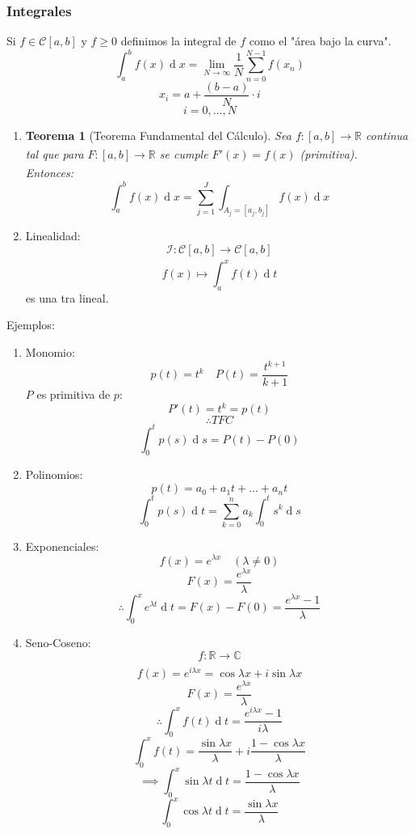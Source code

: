 \documentclass[11pt]{book}
\renewcommand{\d}[1]{\ensuremath{\operatorname{d}\!{#1}}}
\newcommand{\set}[1]{\mathbb{#1}}
\newcommand{\func}[5]{#1:#2\xrightarrow[#5]{#4}#3}
\newtheorem{thm}{Teorema}[section]
\theoremstyle{definition}
\begin{document}
\subsubsection{Integrales}
Si $f\in\mathcal{C}[a,b]$ y $f\geq 0$ definimos la integral de $f$ como el "área bajo la curva".
\[\int^b_a f(x)\d{x}=\lim_{N\rightarrow\infty}\frac{1}{N}\sum^{N-1}_{n=0}f(x_n)\]
\[x_i=a+\frac{(b-a)}{N}\cdot i\]
\[i=0,...,N\]
\begin{enumerate}
	\item \begin{thm}[Teorema Fundamental del Cálculo]
		Sea $\func{f}{[a,b]}{\set{R}}{}{}$ continua tal que para $\func{F}{[a,b]}{\set{R}}{}{}$ se cumple $F'(x)=f(x)$ (primitiva).\\
		Entonces:
		\[\int^b_a f(x)\d{x}=\sum^J_{j=1}\int_{A_j=[a_j,b_j]}f(x)\d{x}\]
	\end{thm}

	\item Linealidad:
	\[\func{\mathcal{I}}{\mathcal{C}[a,b]}{\mathcal{C}[a,b]}{}{}\]
	\[f(x)\mapsto\int^x_af(t)\d{t}\]
	es una tra lineal.
\end{enumerate}
Ejemplos:
\begin{enumerate}
	\item Monomio:
	\[p(t)=t^k\quad P(t)=\frac{t^{k+1}}{k+1}\]
	$P$ es primitiva de $p$:
	\[P'(t)=t^k=p(t)\]
	\[\therefore TFC\]
	\[\int^t_0p(s)\d{s}=P(t)-P(0)\]

	\item Polinomios:
	\[p(t)=a_0+a_1t+...+a_nt\]
	\[\int^t_0p(s)\d{t}=\sum^n_{k=0}a_k\int^t_0s^k\d{s}\]

	\item Exponenciales:
	\[f(x)=e^{\lambda x}\quad(\lambda\neq 0)\]
	\[F(x)=\frac{e^{\lambda x}}{\lambda}\]
	\[\therefore \int^x_0e^{\lambda t}\d{t}=F(x)-F(0)=\frac{e^{\lambda x}-1}{\lambda}\]
	
	\item Seno-Coseno:
	\[\func{f}{\set{R}}{\set{C}}{}{}\]
	\[f(x)=e^{i\lambda x}=\cos\lambda x+i\sin\lambda x\]
	\[F(x)=\frac{e^{\lambda x}}{\lambda}\]
	\[\therefore\int^x_0f(t)\d{t}=\frac{e^{i\lambda x}-1}{i\lambda}\]
	\[\int^x_0f(t)=\frac{\sin \lambda x}{\lambda}+i\frac{1-\cos \lambda x}{\lambda}\]
	\[\implies \int^x_0\sin\lambda t\d{t}=\frac{1-\cos \lambda x}{\lambda}\]
	\[\int^x_0\cos\lambda t\d{t}=\frac{\sin \lambda x}{\lambda}\]
\end{enumerate}
\end{document}
